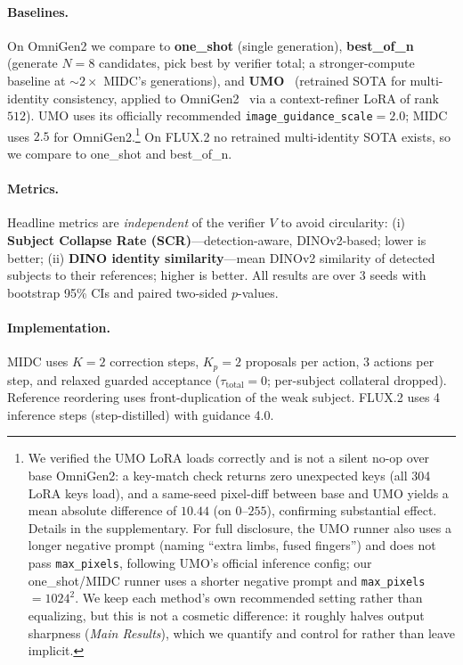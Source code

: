 \documentclass[letterpaper]{article}
\begin{document}
\paragraph{Baselines.} On OmniGen2 we compare to \textbf{one\_shot} (single generation), \textbf{best\_of\_n} (generate $N{=}8$ candidates, pick best by verifier total; a stronger-compute baseline at $\sim 2\times$ MIDC's generations), and \textbf{UMO}~\citep{cheng2025umo} (retrained SOTA for multi-identity consistency, applied to OmniGen2~\citep{wu2025omnigen2} via a context-refiner LoRA of rank $512$). UMO uses its officially recommended \texttt{image\_guidance\_scale}$=2.0$; MIDC uses $2.5$ for OmniGen2.\footnote{We verified the UMO LoRA loads correctly and is not a silent no-op over base OmniGen2: a key-match check returns zero unexpected keys (all 304 LoRA keys load), and a same-seed pixel-diff between base and UMO yields a mean absolute difference of $10.44$ (on $0$–$255$), confirming substantial effect. Details in the supplementary. For full disclosure, the UMO runner also uses a longer negative prompt (naming ``extra limbs, fused fingers'') and does not pass \texttt{max\_pixels}, following UMO's official inference config; our one\_shot/MIDC runner uses a shorter negative prompt and \texttt{max\_pixels}$=1024^2$. We keep each method's own recommended setting rather than equalizing, but this is not a cosmetic difference: it roughly halves output sharpness (\emph{Main Results}), which we quantify and control for rather than leave implicit.} On FLUX.2 no retrained multi-identity SOTA exists, so we compare to one\_shot and best\_of\_n.

\paragraph{Metrics.} Headline metrics are \emph{independent} of the verifier $V$ to avoid circularity: (i) \textbf{Subject Collapse Rate (SCR)}---detection-aware, DINOv2-based; lower is better; (ii) \textbf{DINO identity similarity}---mean DINOv2 similarity of detected subjects to their references; higher is better. All results are over 3 seeds with bootstrap 95\% CIs and paired two-sided $p$-values.

\paragraph{Implementation.} MIDC uses $K{=}2$ correction steps, $K_p{=}2$ proposals per action, 3 actions per step, and relaxed guarded acceptance ($\tau_{\mathrm{total}}{=}0$; per-subject collateral dropped). Reference reordering uses front-duplication of the weak subject. FLUX.2 uses 4 inference steps (step-distilled) with guidance 4.0.
\end{document}
